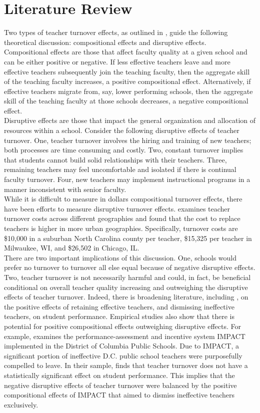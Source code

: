 \documentclass[12pt]{report}
\begin{document}
\section{Literature Review}
\normalsize \noindent Two types of teacher turnover effects, as outlined in \cite{ronfeldt}, guide the following theoretical discussion: compositional effects and disruptive effects. 
\\
\indent Compositional effects are those that affect faculty quality at a given school and can be either positive or negative. If less effective teachers leave and more effective teachers subsequently join the teaching faculty, then the aggregate skill of the teaching faculty increases, a positive compositional effect. Alternatively, if effective teachers migrate from, say, lower performing schools, then the aggregate skill of the teaching faculty at those schools decreases, a negative compositional effect. \\
\indent Disruptive effects are those that impact the general organization and allocation of resources within a school. Consider the following disruptive effects of teacher turnover. One, teacher turnover involves the hiring and training of new teachers; both processes are time consuming and costly. Two, constant turnover implies that students cannot build solid relationships with their teachers. Three, remaining teachers may feel uncomfortable and isolated if there is continual faculty turnover. Four, new teachers may implement instructional programs in a manner inconsistent with senior faculty. \\
\indent While it is difficult to measure in dollars compositional turnover effects, there have been efforts to measure disruptive turnover effects. \cite{barnes} examines teacher turnover costs across different geographies and found that the cost to replace teachers is higher in more urban geographies. Specifically, turnover costs are \$10,000 in a suburban North Carolina county per teacher, \$15,325 per teacher in Milwaukee, WI, and \$26,502 in Chicago, IL. \\
\indent There are two important implications of this discussion. One, schools would prefer no turnover to turnover all else equal because of negative disruptive effects. Two, teacher turnover is not necessarily harmful and could, in fact, be beneficial conditional on overall teacher quality increasing and outweighing the disruptive effects of teacher turnover. Indeed, there is broadening literature, including \cite{staiger}, on the positive effects of retaining effective teachers, and dismissing ineffective teachers, on student performance. Empirical studies also show that there is potential for positive compositional effects outweighing disruptive effects. For example, \cite{adnot} examines the performance-assessment and incentive system IMPACT implemented in the District of Columbia Public Schools. Due to IMPACT, a significant portion of ineffective D.C. public school teachers were purposefully compelled to leave. In their sample, \cite{adnot} finds that teacher turnover does not have a statistically significant effect on student performance. This implies that the negative disruptive effects of teacher turnover were balanced by the positive compositional effects of IMPACT that aimed to dismiss ineffective teachers exclusively.
\end{document}
